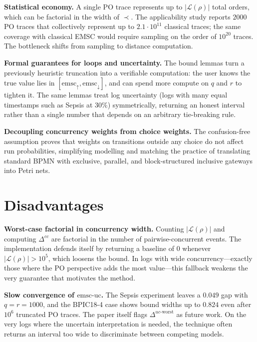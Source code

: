 \documentclass[runningheads]{llncs}
\begin{document}
\noindent\textbf{Statistical economy.} A single PO trace represents up to $|\mathcal{L}(\rho)|$ total orders, which can be factorial in the width of $\prec$. The applicability study reports $2000$ PO traces that collectively represent up to $2.1 \cdot 10^{11}$ classical traces; the same coverage with classical EMSC would require sampling on the order of $10^{20}$ traces. The bottleneck shifts from sampling to distance computation.

\noindent\textbf{Formal guarantees for loops and uncertainty.} The bound lemmas turn a previously heuristic truncation into a verifiable computation: the user knows the true value lies in $[\mathrm{emsc}_{\uparrow}, \mathrm{emsc}_{\downarrow}]$, and can spend more compute on $q$ and $r$ to tighten it. The same lemmas treat log uncertainty (logs with many equal timestamps such as Sepsis at $30\%$) symmetrically, returning an honest interval rather than a single number that depends on an arbitrary tie-breaking rule.

\noindent\textbf{Decoupling concurrency weights from choice weights.} The confusion-free assumption proves that weights on transitions outside any choice do not affect run probabilities, simplifying modelling and matching the practice of translating standard BPMN with exclusive, parallel, and block-structured inclusive gateways into Petri nets.

\section{Disadvantages}

\noindent\textbf{Worst-case factorial in concurrency width.} Counting $|\mathcal{L}(\rho)|$ and computing $\Delta^{cc}$ are factorial in the number of pairwise-concurrent events. The implementation defends itself by returning a baseline of $0$ whenever $|\mathcal{L}(\rho)| > 10^{5}$, which loosens the bound. In logs with wide concurrency---exactly those where the PO perspective adds the most value---this fallback weakens the very guarantee that motivates the method.

\noindent\textbf{Slow convergence of $\mathrm{emsc\text{-}uc}$.} The Sepsis experiment leaves a $0.049$ gap with $q = r = 1000$, and the BPIC18-4 case shows bound widths up to $0.824$ even after $10^{6}$ truncated PO traces. The paper itself flags $\Delta^{uc\text{-}\mathrm{worst}}$ as future work. On the very logs where the uncertain interpretation is needed, the technique often returns an interval too wide to discriminate between competing models.
\end{document}

